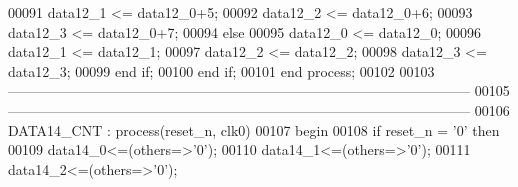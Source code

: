 \begin{DoxyCode}
00091             \textcolor{vhdlchar}{data12_1} \textcolor{vhdlchar}{<=} \textcolor{vhdlchar}{data12_0}\textcolor{vhdlchar}{+}\textcolor{vhdllogic}{}\textcolor{vhdllogic}{5};
00092             \textcolor{vhdlchar}{data12_2} \textcolor{vhdlchar}{<=} \textcolor{vhdlchar}{data12_0}\textcolor{vhdlchar}{+}\textcolor{vhdllogic}{}\textcolor{vhdllogic}{6};
00093             \textcolor{vhdlchar}{data12_3} \textcolor{vhdlchar}{<=} \textcolor{vhdlchar}{data12_0}\textcolor{vhdlchar}{+}\textcolor{vhdllogic}{}\textcolor{vhdllogic}{7}; 
00094          \textcolor{keywordflow}{else} 
00095             \textcolor{vhdlchar}{data12_0} \textcolor{vhdlchar}{<=} \textcolor{vhdlchar}{data12_0};
00096             \textcolor{vhdlchar}{data12_1} \textcolor{vhdlchar}{<=} \textcolor{vhdlchar}{data12_1};
00097             \textcolor{vhdlchar}{data12_2} \textcolor{vhdlchar}{<=} \textcolor{vhdlchar}{data12_2};
00098             \textcolor{vhdlchar}{data12_3} \textcolor{vhdlchar}{<=} \textcolor{vhdlchar}{data12_3}; 
00099          \textcolor{keywordflow}{end} \textcolor{keywordflow}{if};
00100       \textcolor{keywordflow}{end} \textcolor{keywordflow}{if};
00101    \textcolor{keywordflow}{end} \textcolor{keywordflow}{process};
00102    
00103 \textcolor{keyword}{   ---------------------------------------------------------------------------------------------------}
00105 \textcolor{keyword}{   ---------------------------------------------------------------------------------------------------}
00106    DATA14\_CNT : \textcolor{keywordflow}{process}(reset_n, clk0)
00107 \textcolor{vhdlkeyword}{   begin}
00108       \textcolor{keywordflow}{if} \textcolor{vhdlchar}{reset_n} \textcolor{vhdlchar}{=} \textcolor{vhdlchar}{'}\textcolor{vhdllogic}{}\textcolor{vhdllogic}{0}\textcolor{vhdlchar}{'} \textcolor{keywordflow}{then} 
00109          \textcolor{vhdlchar}{data14_0}\textcolor{vhdlchar}{<=}\textcolor{vhdlchar}{(}\textcolor{keywordflow}{others}\textcolor{vhdlchar}{=}\textcolor{vhdlchar}{>}\textcolor{vhdlchar}{'}\textcolor{vhdllogic}{}\textcolor{vhdllogic}{0}\textcolor{vhdlchar}{'}\textcolor{vhdlchar}{)};
00110          \textcolor{vhdlchar}{data14_1}\textcolor{vhdlchar}{<=}\textcolor{vhdlchar}{(}\textcolor{keywordflow}{others}\textcolor{vhdlchar}{=}\textcolor{vhdlchar}{>}\textcolor{vhdlchar}{'}\textcolor{vhdllogic}{}\textcolor{vhdllogic}{0}\textcolor{vhdlchar}{'}\textcolor{vhdlchar}{)};
00111          \textcolor{vhdlchar}{data14_2}\textcolor{vhdlchar}{<=}\textcolor{vhdlchar}{(}\textcolor{keywordflow}{others}\textcolor{vhdlchar}{=}\textcolor{vhdlchar}{>}\textcolor{vhdlchar}{'}\textcolor{vhdllogic}{}\textcolor{vhdllogic}{0}\textcolor{vhdlchar}{'}\textcolor{vhdlchar}{)};

\end{DoxyCode}
